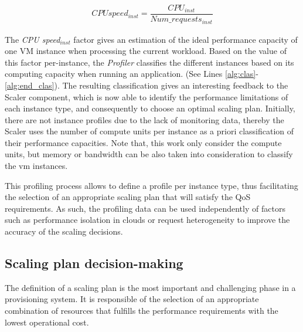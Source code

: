\begin{enumerate}
{\scriptsize
\begin{equation}\label{cpu_speed}
\begin{split}
CPU speed_{inst} = \dfrac{  CPU_{inst} } {Num\_requests_{inst} } 
\end{split}
\end{equation}
}

The \emph{CPU speed$_{inst}$} factor gives an estimation of the ideal performance capacity of one VM instance when processing the current workload. Based on the value of this factor per-instance, the \emph{Profiler} classifies the different instances based on its computing capacity when running an application. (See Lines \ref{alg:clas}-\ref{alg:end_clas}). The resulting classification gives an interesting feedback to the Scaler component, which is now able to identify the performance limitations of each instance type, and consequently to choose an optimal scaling plan. Initially, there are not instance profiles due to the lack of monitoring data, thereby the Scaler uses the number of compute units per instance as a priori classification of their performance capacities. Note that, this work only consider the compute units, but memory or bandwidth can be also taken into consideration to classify the vm instances.

\end{enumerate}

This profiling process allows to define a profile per instance type, thus facilitating the selection of an appropriate scaling plan that will satisfy the QoS requirements. As such, the profiling data can be used independently of factors such as performance isolation in clouds or request heterogeneity to improve the accuracy of the scaling decisions.


\subsection{Scaling plan decision-making}

The definition of a scaling plan is the most important and challenging phase in a provisioning system. It is responsible of the selection of an appropriate combination of resources that fulfills the performance requirements with the lowest operational cost. 


